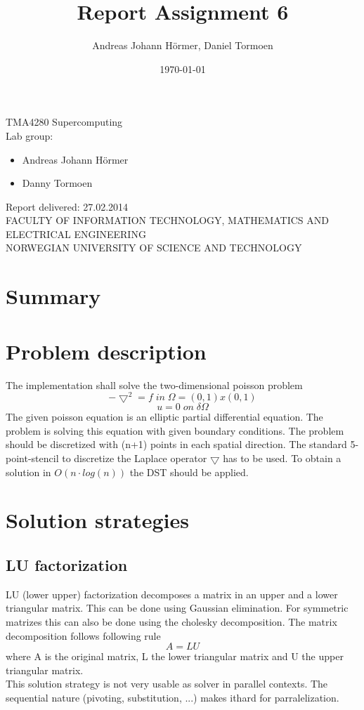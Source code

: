 \documentclass{article}
\title{Report Assignment 6}
\author{Andreas Johann H\"ormer, Daniel Tormoen}
\date{\today}
\begin{document}
\thispagestyle{empty}
\maketitle
\thispagestyle{empty}
\begin{center}
TMA4280 Supercomputing\\[3cm]
Lab group:
\begin{itemize}
\item Andreas Johann H\"ormer
\item Danny Tormoen\\[3cm]
\end{itemize}
Report delivered: 27.02.2014\\[6cm]
FACULTY OF INFORMATION TECHNOLOGY, MATHEMATICS AND ELECTRICAL ENGINEERING\\
NORWEGIAN UNIVERSITY OF SCIENCE AND TECHNOLOGY
\end{center}
\thispagestyle{empty}
\newpage
\tableofcontents
\thispagestyle{empty}
\newpage
\section*{Summary}
\thispagestyle{empty}

\newpage
\setcounter{page}{1}
\section{Problem description}
The implementation shall solve the two-dimensional poisson problem 
\begin{equation}
-\bigtriangledown^2=f\;in\;\Omega = (0,1)x(0,1)
\end{equation}
\begin{equation}
u = 0\;on\;\delta\Omega
\end{equation}
The given poisson equation is an elliptic partial differential equation. The problem is solving this equation with given boundary conditions. 
The problem should be discretized with (n+1) points in each spatial direction. The standard 5-point-stencil to discretize the Laplace operator $\bigtriangledown$ has to be used. To obtain a solution in $O(n\cdot log(n))$ the DST should be applied.
\section{Solution strategies}
\subsection{LU factorization}
LU (lower upper) factorization decomposes a matrix in an upper and a lower triangular matrix. This can be done using Gaussian elimination. For symmetric matrizes this can also be done using the cholesky decomposition. The matrix decomposition follows following rule
\begin{equation}
A=LU
\end{equation}
where A is the original matrix, L the lower triangular matrix and U the upper triangular matrix.\\
This solution strategy is not very usable as solver in parallel contexts. The sequential nature (pivoting, substitution, ...) makes ithard for parralelization.
\end{document}
